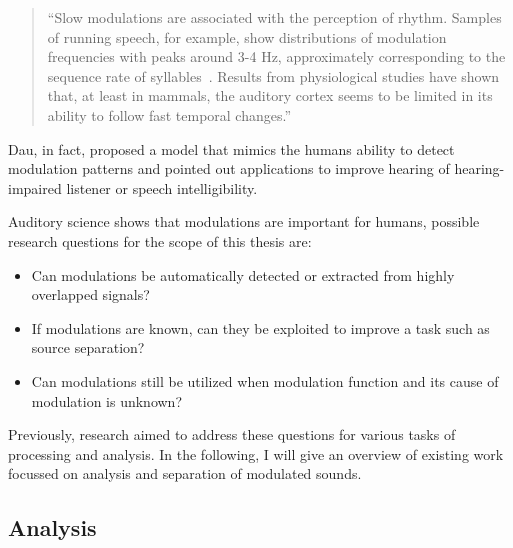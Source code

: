 \begin{quote}
``Slow modulations are associated with the perception of rhythm. Samples of running speech, for example, show distributions of modulation frequencies with peaks around 3-4 Hz, approximately corresponding to the sequence rate of syllables~\cite{plomp83}. Results from physiological studies have shown that, at least in mammals, the auditory cortex seems to be limited in its ability to follow fast temporal changes.''
\end{quote}

Dau, in fact, proposed a model that mimics the humans ability to detect modulation patterns and pointed out applications to improve hearing of hearing-impaired listener or speech intelligibility.
\par
Auditory science shows that modulations are important for humans, possible research questions for the scope of this thesis are:

\begin{itemize}
  \item Can modulations be automatically detected or extracted from highly overlapped signals?
  \item If modulations are known, can they be exploited to improve a task such as source separation?
  \item Can modulations still be utilized when modulation function and its cause of modulation is unknown?
\end{itemize}

Previously, research aimed to address these questions for various tasks of processing and analysis. 
In the following, I will give an overview of existing work focussed on analysis and separation of modulated sounds.

\subsection{Analysis}

